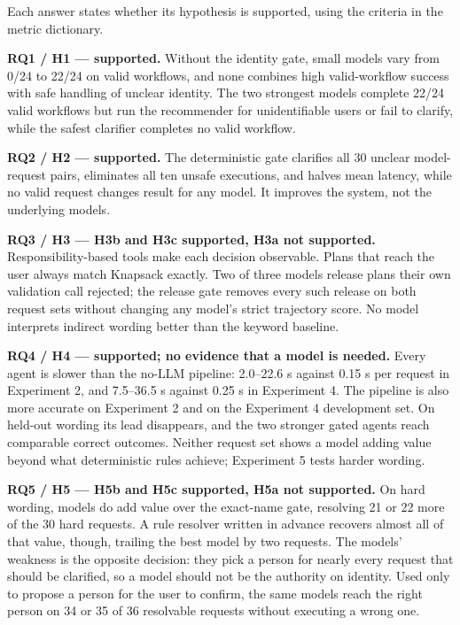 \documentclass[
  10pt,
  letterpaper,
]{article}
\begin{document}
Each answer states whether its hypothesis is supported, using the
criteria in the metric dictionary.

\textbf{RQ1 / H1 --- supported.} Without the identity gate, small models
vary from 0/24 to 22/24 on valid workflows, and none combines high
valid-workflow success with safe handling of unclear identity. The two
strongest models complete 22/24 valid workflows but run the recommender
for unidentifiable users or fail to clarify, while the safest clarifier
completes no valid workflow.

\textbf{RQ2 / H2 --- supported.} The deterministic gate clarifies all 30
unclear model-request pairs, eliminates all ten unsafe executions, and
halves mean latency, while no valid request changes result for any
model. It improves the system, not the underlying models.

\textbf{RQ3 / H3 --- H3b and H3c supported, H3a not supported.}
Responsibility-based tools make each decision observable. Plans that
reach the user always match Knapsack exactly. Two of three models
release plans their own validation call rejected; the release gate
removes every such release on both request sets without changing any
model's strict trajectory score. No model interprets indirect wording
better than the keyword baseline.

\textbf{RQ4 / H4 --- supported; no evidence that a model is needed.}
Every agent is slower than the no-LLM pipeline: 2.0--22.6 s against 0.15
s per request in Experiment 2, and 7.5--36.5 s against 0.25 s in
Experiment 4. The pipeline is also more accurate on Experiment 2 and on
the Experiment 4 development set. On held-out wording its lead
disappears, and the two stronger gated agents reach comparable correct
outcomes. Neither request set shows a model adding value beyond what
deterministic rules achieve; Experiment 5 tests harder wording.

\textbf{RQ5 / H5 --- H5b and H5c supported, H5a not supported.} On hard
wording, models do add value over the exact-name gate, resolving 21 or
22 more of the 30 hard requests. A rule resolver written in advance
recovers almost all of that value, though, trailing the best model by
two requests. The models' weakness is the opposite decision: they pick a
person for nearly every request that should be clarified, so a model
should not be the authority on identity. Used only to propose a person
for the user to confirm, the same models reach the right person on 34 or
35 of 36 resolvable requests without executing a wrong one.
\end{document}
